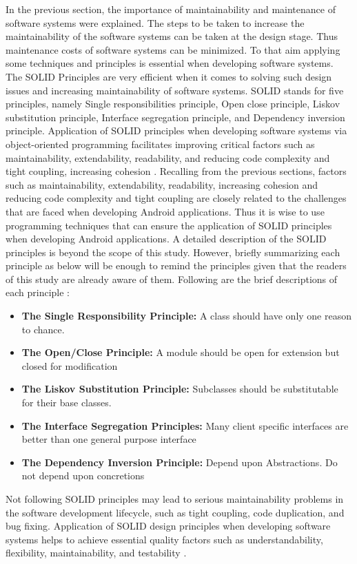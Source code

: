 \label{section:SOLID}
In the previous section, the importance of maintainability and maintenance of software systems were explained. The steps to be taken to increase the maintainability of the software systems can be taken at the design stage. Thus maintenance costs of software systems can be minimized. To that aim applying some techniques and principles is essential when developing software systems. The SOLID Principles are very efficient when it comes to solving such design issues and increasing maintainability of software systems. SOLID stands for five principles, namely Single responsibilities principle, Open close principle, Liskov substitution principle, Interface segregation principle, and Dependency inversion principle. Application of SOLID principles when developing software systems via object-oriented programming facilitates improving critical factors such as maintainability, extendability, readability, and reducing code complexity and tight coupling, increasing cohesion \cite{26}. Recalling from the previous sections, factors such as maintainability, extendability, readability, increasing cohesion and reducing code complexity and tight coupling are closely related to the challenges that are faced when developing Android applications. Thus it is wise to use programming techniques that can ensure the application of SOLID principles when developing Android applications. A detailed description of the SOLID principles is beyond the scope of this study. However, briefly summarizing each principle as below will be enough to remind the principles given that the readers of this study are already aware of them. Following are the brief descriptions of each principle \cite{26}:
\begin{itemize}
    \item \textbf{The Single Responsibility Principle:} A class should have only one reason to chance.
    \item \textbf{The Open/Close Principle:} A module should be open for extension but closed for modification
    \item \textbf{The Liskov Substitution Principle:} Subclasses should be substitutable for their base classes.
    \item \textbf{The Interface Segregation Principles:} Many client specific interfaces are better than one general purpose interface 
    \item \textbf{The Dependency Inversion Principle:} Depend upon Abstractions. Do not depend upon concretions
\end{itemize}
Not following SOLID principles may lead to serious maintainability problems in the software development lifecycle, such as tight coupling, code duplication, and bug fixing. Application of SOLID design principles when developing software systems helps to achieve essential quality factors such as understandability, flexibility, maintainability, and testability \cite{26}.